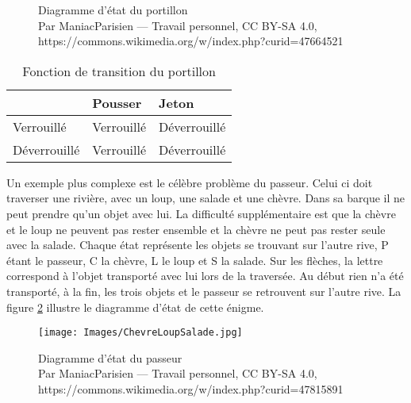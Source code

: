 \begin{figure}[H]
	\centering
	\caption{Diagramme d'état du portillon \\{\footnotesize
			Par ManiacParisien — Travail personnel, CC BY-SA 4.0, https://commons.wikimedia.org/w/index.php?curid=47664521}}
	\label{diagrammeetat}
\end{figure}


\begin{table}[H]
	\centering
	
	\begin{tabular}{|l|l|l|}
		\hline
		& Pousser    & Jeton       \\ \hline
		Verrouillé   & Verrouillé & Déverrouillé \\ \hline
		Déverrouillé & Verrouillé & Déverrouillé \\ \hline
	\end{tabular}
	\caption{Fonction de transition du portillon}
	\label{FTPortillon}
\end{table}  

Un exemple plus complexe est le célèbre problème du passeur. Celui ci doit traverser une rivière, avec un loup, une salade et une chèvre. Dans sa barque il ne peut prendre qu'un objet avec lui. La difficulté supplémentaire est que la chèvre et le loup ne peuvent pas rester ensemble et la chèvre ne peut pas rester seule avec la salade. Chaque état représente les objets se trouvant sur l'autre rive, P étant le passeur, C la chèvre, L le loup et S la salade. Sur les flèches, la lettre correspond à l'objet transporté avec lui lors de la traversée. Au début rien n'a été transporté, à la fin, les trois objets et le passeur se retrouvent sur l'autre rive.
La figure \ref{Salade} illustre le diagramme d'état de cette énigme.
\begin{figure}[h]
	\centering
	\texttt{[image: Images/ChevreLoupSalade.jpg]}
	\caption{Diagramme d'état du passeur \\{\footnotesize Par ManiacParisien — Travail personnel, CC BY-SA 4.0, https://commons.wikimedia.org/w/index.php?curid=47815891}}
	\label{Salade}
\end{figure}

